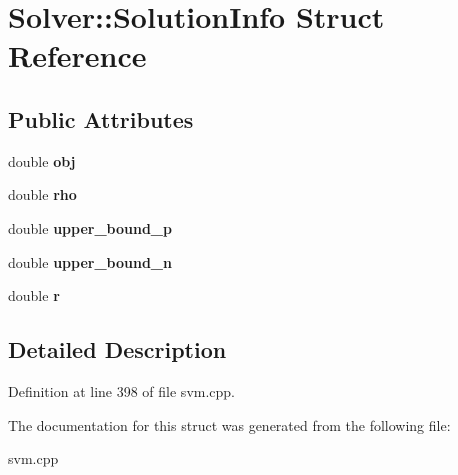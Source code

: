 \hypertarget{struct_solver_1_1_solution_info}{
\section{Solver::SolutionInfo Struct Reference}
\label{struct_solver_1_1_solution_info}
}
\subsection*{Public Attributes}
\begin{DoxyCompactItemize}
\item 
\hypertarget{struct_solver_1_1_solution_info_adf1d775e9152a7b1742057cd638ed2ae}{
double {\bfseries obj}}
\label{struct_solver_1_1_solution_info_adf1d775e9152a7b1742057cd638ed2ae}

\item 
\hypertarget{struct_solver_1_1_solution_info_a8091f45a336af39e232f3845e25f2266}{
double {\bfseries rho}}
\label{struct_solver_1_1_solution_info_a8091f45a336af39e232f3845e25f2266}

\item 
\hypertarget{struct_solver_1_1_solution_info_a94c4cb7f402752326cc975ec57a8688f}{
double {\bfseries upper\_\-bound\_\-p}}
\label{struct_solver_1_1_solution_info_a94c4cb7f402752326cc975ec57a8688f}

\item 
\hypertarget{struct_solver_1_1_solution_info_a07ab9dc3265855f483922988bdaaf986}{
double {\bfseries upper\_\-bound\_\-n}}
\label{struct_solver_1_1_solution_info_a07ab9dc3265855f483922988bdaaf986}

\item 
\hypertarget{struct_solver_1_1_solution_info_a3db948f9e914e1f9976523cfdc7c1bbe}{
double {\bfseries r}}
\label{struct_solver_1_1_solution_info_a3db948f9e914e1f9976523cfdc7c1bbe}

\end{DoxyCompactItemize}


\subsection{Detailed Description}


Definition at line 398 of file svm.cpp.



The documentation for this struct was generated from the following file:\begin{DoxyCompactItemize}
\item 
svm.cpp\end{DoxyCompactItemize}
